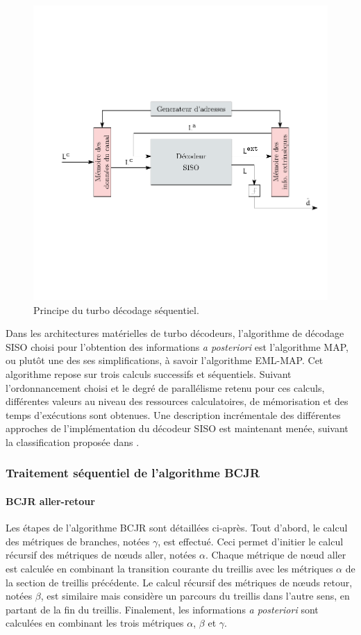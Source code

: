 \begin{figure}[!h]
	\centering
	\includegraphics{main/ch4_fig/ipe/serial.pdf}
	\caption{Principe du turbo décodage séquentiel. \label{fig:turbo_seq}}
\end{figure} 

Dans les architectures matérielles de turbo décodeurs, l'algorithme de décodage SISO choisi pour l’obtention des informations \textit{a posteriori} est l'algorithme MAP, 
ou plutôt une des ses simplifications, à savoir l'algorithme EML-MAP. Cet algorithme repose sur trois calculs successifs et 
séquentiels. Suivant l'ordonnancement choisi et le degré de parallélisme retenu pour ces calculs, différentes valeurs 
au niveau des ressources calculatoires, de mémorisation et des temps d'exécutions sont obtenues. Une description
incrémentale des différentes approches de l'implémentation du décodeur SISO est maintenant menée, suivant la 
classification proposée dans \cite{Muller2010}.

\subsubsection{Traitement séquentiel de l'algorithme BCJR}
\paragraph*{BCJR aller-retour}
Les étapes de l'algorithme BCJR sont détaillées ci-après. Tout d'abord, le calcul des métriques de branches, notées 
$\gamma$, est effectué. Ceci permet d’initier le calcul récursif des métriques de nœuds aller, notées $\alpha$. Chaque 
métrique de nœud aller est calculée en combinant la transition courante du treillis avec les métriques $\alpha$ de la 
section de treillis précédente. Le calcul récursif des métriques de nœuds retour, notées $\beta$, est similaire mais
considère un parcours du treillis %
dans l'autre sens, en partant de la fin du treillis. Finalement, les 
informations \textit{a posteriori} sont calculées en combinant les trois métriques $\alpha$, $\beta$ et $\gamma$. 

